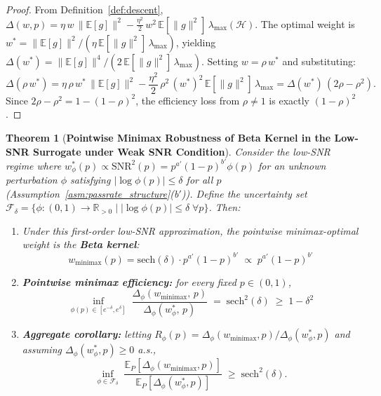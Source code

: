 \documentclass{article}
\newtheorem{theorem}{Theorem}
\begin{document}
\begin{proof}
From Definition~\ref{def:descent}, $\Delta(w, p) = \eta\,w\,\|\mathbb{E}[g]\|^2 - \frac{\eta^2}{2}\,w^2\,\mathbb{E}[\|g\|^2]\,\lambda_{\max}(\mathcal{H})$. The optimal weight is $w^* = \|\mathbb{E}[g]\|^2/(\eta\,\mathbb{E}[\|g\|^2]\,\lambda_{\max})$, yielding $\Delta(w^*) = \|\mathbb{E}[g]\|^4/(2\,\mathbb{E}[\|g\|^2]\,\lambda_{\max})$. Setting $w = \rho\,w^*$ and substituting:
\begin{equation}
  \Delta(\rho\,w^*) = \eta\,\rho\,w^*\,\|\mathbb{E}[g]\|^2 - \frac{\eta^2}{2}\,\rho^2\,(w^*)^2\,\mathbb{E}[\|g\|^2]\,\lambda_{\max} = \Delta(w^*)\,(2\rho - \rho^2).
\end{equation}
Since $2\rho - \rho^2 = 1 - (1-\rho)^2$, the efficiency loss from $\rho \neq 1$ is exactly $(1-\rho)^2$.
\end{proof}

\begin{theorem}[\textbf{Pointwise Minimax Robustness of Beta Kernel in the Low-SNR Surrogate under Weak SNR Condition}]
\label{thm:minimax}
Consider the low-SNR regime where $w^*_\phi(p) \propto \text{SNR}^2(p) = p^{a'}(1-p)^{b'}\phi(p)$ for an unknown perturbation $\phi$ satisfying $|\log \phi(p)| \leq \delta$ for all $p$ (Assumption~\ref{asm:passrate_structure}(b$'$)). Define the uncertainty set $\mathcal{F}_\delta = \{\phi : (0,1) \to \mathbb{R}_{>0} \mid |\log \phi(p)| \leq \delta\; \forall p\}$. Then:
\begin{enumerate}
  \item[\textbf{(i)}] Under this first-order low-SNR approximation, the pointwise minimax-optimal weight is the \textbf{Beta kernel}:
  \begin{equation}
    w_{\mathrm{minimax}}(p) = \mathrm{sech}(\delta) \cdot p^{a'}(1-p)^{b'} \;\propto\; p^{a'}(1-p)^{b'}
  \end{equation}
  \item[\textbf{(ii)}] \textbf{Pointwise minimax efficiency:} for every fixed $p \in (0,1)$,
  \begin{equation}
    \boxed{\;\inf_{\phi(p) \in [e^{-\delta},e^{\delta}]}\;\frac{\Delta_{\phi}(w_{\mathrm{minimax}},\,p)}{\Delta_{\phi}(w^*_{\phi},\,p)} \;=\; \mathrm{sech}^2(\delta) \;\geq\; 1 - \delta^2\;}
    \label{eq:minimax_eff}
  \end{equation}
  \item[\textbf{(iii)}] \textbf{Aggregate corollary:} letting $R_{\phi}(p)=\Delta_{\phi}(w_{\mathrm{minimax}},p)/\Delta_{\phi}(w^*_{\phi},p)$ and assuming $\Delta_{\phi}(w^*_{\phi},p)\ge 0$ a.s.,
  \begin{equation}
    \inf_{\phi \in \mathcal{F}_\delta}\;\frac{\mathbb{E}_P[\Delta_{\phi}(w_{\mathrm{minimax}},p)]}{\mathbb{E}_P[\Delta_{\phi}(w^*_{\phi},p)]} \;\ge\; \mathrm{sech}^2(\delta).
  \end{equation}
\end{enumerate}
\end{theorem}
\end{document}
